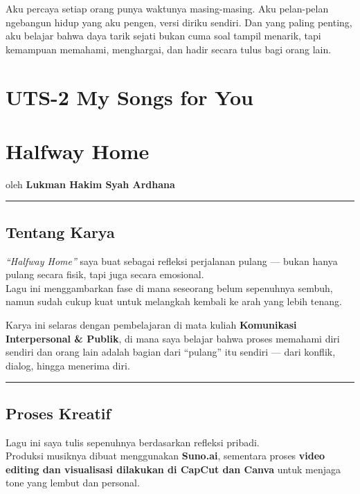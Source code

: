 \documentclass[
  letterpaper,
  DIV=11,
  numbers=noendperiod]{scrreprt}
\begin{document}
Aku percaya setiap orang punya waktunya masing-masing. Aku pelan-pelan
ngebangun hidup yang aku pengen, versi diriku sendiri. Dan yang paling
penting, aku belajar bahwa daya tarik sejati bukan cuma soal tampil
menarik, tapi kemampuan memahami, menghargai, dan hadir secara tulus
bagi orang lain.


\chapter{UTS-2 My Songs for You}\label{uts-2-my-songs-for-you}


\chapter{Halfway Home 🎵}\label{halfway-home}

oleh \textbf{Lukman Hakim Syah Ardhana}

\begin{center}\rule{0.5\linewidth}{0.5pt}\end{center}

\section{Tentang Karya}\label{tentang-karya}

\emph{``Halfway Home''} saya buat sebagai refleksi perjalanan pulang ---
bukan hanya pulang secara fisik, tapi juga secara emosional.\\
Lagu ini menggambarkan fase di mana seseorang belum sepenuhnya sembuh,
namun sudah cukup kuat untuk melangkah kembali ke arah yang lebih
tenang.

Karya ini selaras dengan pembelajaran di mata kuliah \textbf{Komunikasi
Interpersonal \& Publik}, di mana saya belajar bahwa proses memahami
diri sendiri dan orang lain adalah bagian dari ``pulang'' itu sendiri
--- dari konflik, dialog, hingga menerima diri.

\begin{center}\rule{0.5\linewidth}{0.5pt}\end{center}

\section{Proses Kreatif}\label{proses-kreatif}

Lagu ini saya tulis sepenuhnya berdasarkan refleksi pribadi.\\
Produksi musiknya dibuat menggunakan \textbf{Suno.ai}, sementara proses
\textbf{video editing dan visualisasi dilakukan di CapCut dan Canva}
untuk menjaga tone yang lembut dan personal.
\end{document}
